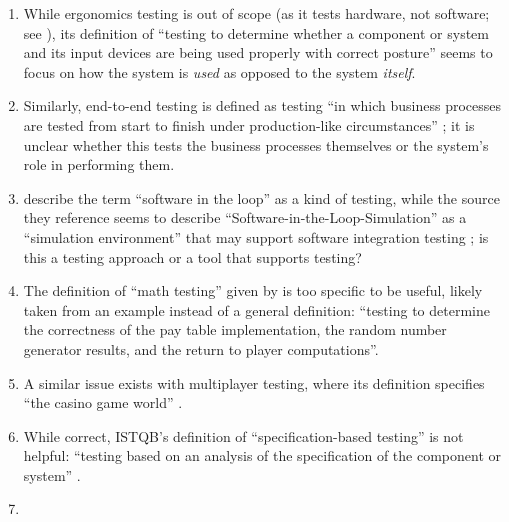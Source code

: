 \begin{enumerate}
    \item %
          While ergonomics testing is out of scope (as it tests hardware, not
          software; see ), its definition of ``testing to
          determine whether a component or system and its input devices are
          being used properly with correct posture'' \citepISTQB{} seems to
          focus on how the system is \emph{used} as opposed to the system
          \emph{itself}.
    \item %
          Similarly, end-to-end testing is defined as testing ``in which
          business processes are tested from start to finish under
          production-like circumstances'' \citepISTQB{}; it is unclear
          whether this tests the business processes themselves or the system's
          role in performing them.
    \item %
          \citetISTQB{} describe the term ``software in the loop'' as a kind of
          testing, while the source they reference seems to
          describe ``Software-in-the-Loop-Simulation'' as a ``simulation
          environment'' that may support software integration testing
          \citep[p.~153]{SPICE2022}; is this a testing approach or a tool
          that supports testing?
    \item %
          The definition of ``math testing'' given by \citetISTQB{} is
          too specific to be useful, likely taken from an example instead of
          a general definition: ``testing to determine the correctness of the
          pay table implementation, the random number generator results, and
          the return to player computations''.
    \item %
          A similar issue exists with multiplayer testing, where its
          definition specifies ``the casino game world'' \citepISTQB{}.
    \item %
          While correct, ISTQB's definition of ``specification-based testing''
          is not helpful: ``testing based on an analysis of the specification
          of the component or system'' \citepISTQB{}.
    \item %
          \parSheetTestFlaw{}

\end{enumerate}
